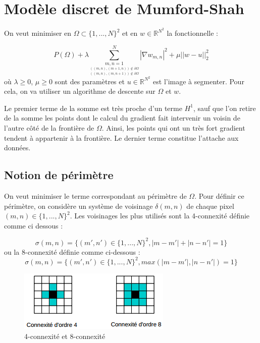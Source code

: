 \section{Modèle discret de Mumford-Shah}

\noindent
On veut minimiser en $\Omega \subset \{1,...,N\}^2$ et en $w \in \mathbb{R}^{N^2}$ la fonctionnelle : 

\[ P(\Omega) + \lambda \sum \limits_{\underset{((m,n), (m, n+1)) \notin \partial \Omega}{\underset{((m,n),(m+1, n)) \notin \partial \Omega}{m,n = 1}}}^{N} |\nabla w_{m,n}|^2 + \mu ||w - u ||_2^2 \]
où $\lambda \geq 0$, $\mu \geq 0$ sont des paramètres et $u \in \mathbb{R}^{N^2}$ est l'image à segmenter. Pour cela, on va utiliser un algorithme de descente sur $\Omega$ et $w$.

\bigskip

Le premier terme de la somme est très proche d'un terme $H^1$, sauf que l'on retire de la somme les points dont le calcul du gradient fait intervenir un voisin de l'autre côté de la frontière de $\Omega$. Ainsi, les points qui ont un très fort gradient tendent à appartenir à la frontière. Le dernier terme constitue l'attache aux données. 

\subsection{Notion de périmètre}

On veut minimiser le terme correspondant au périmètre de $\Omega$. Pour définir ce périmètre, on considère un système de voisinage $\delta(m,n)$ de chaque pixel $(m,n) \in \{1,...,N\}^2$. Les voisinages les plus utilisés sont la 4-connexité définie comme ci dessous :

\[ \sigma (m,n) = \{ (m',n') \in  \{1,...,N\}^2, |m - m' | + |n - n'| = 1 \}\]
ou la 8-connexité définie comme ci-dessous : 
\[ \sigma (m,n) = \{ (m',n') \in  \{1,...,N\}^2, max(|m - m' | , |n - n'| ) = 1 \}\]

\begin{figure}[H]
\centering
\includegraphics[scale=1]{images/Connexite.png}
\caption{4-connexité et 8-connexité}
\end{figure}

